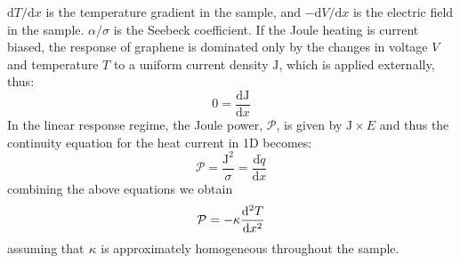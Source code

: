 $\mathrm{d}T/\mathrm{d}x$ is the temperature gradient in the sample,  and $-\mathrm{d}V/\mathrm{d}x$ is the electric field in the sample.  $\alpha/\sigma$ is the Seebeck coefficient.  If the Joule heating is current biased, the response of graphene is dominated only by the changes in voltage $V$ and temperature $T$ to a uniform current density $\mathrm{J}$, which is applied externally, thus:
\begin{equation}\label{eq:1Dconduction_contJ}
0 = \frac{\mathrm{d}\mathrm{J}}{\mathrm{d}x}
\end{equation}
In the linear response regime, the Joule power, $\mathcal{P}$, is given by $\mathrm{J}\times E$ and thus the continuity equation for the heat current in 1D becomes:
\begin{equation}\label{eq:1Dconduction_contq}
\mathcal{P} = \frac{\mathrm{J}^2}{\sigma} =  \frac{\mathrm{d}\dot{q}}{\mathrm{d}x}
\end{equation}\label{eq:1Dconduction_diffeq}
combining the above equations we obtain \begin{equation}
\mathcal{P} = -\mathrm{\kappa} \frac{\mathrm{d}^2 T}{\mathrm{d}x^2}
\end{equation}
assuming that $\mathrm{\kappa}$ is approximately homogeneous throughout the sample.

